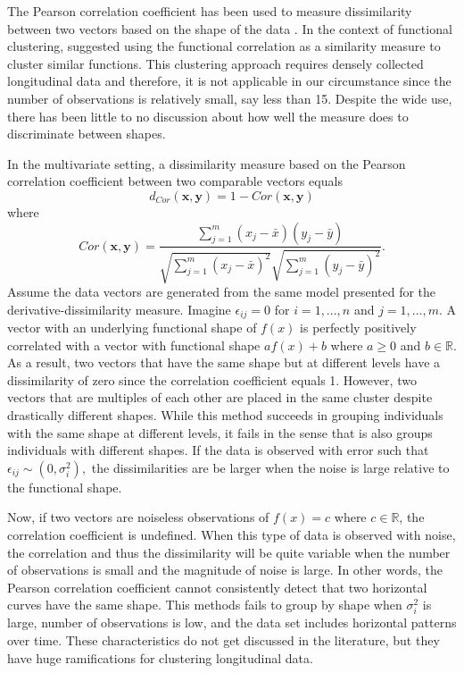 \documentclass[12pt]{article}
\newcommand{\B}[0]{\mathbf}
\begin{document}
The Pearson correlation coefficient has been used to measure dissimilarity between two vectors based on the shape of the data  \cite{chouakria2007,  eisen1998, chiou2008}. In the context of functional clustering, \textcite{chiou2008} suggested using the functional correlation as a similarity measure to cluster similar functions. This clustering approach requires densely collected longitudinal data and therefore, it is not applicable in our circumstance since the number of observations is relatively small, say less than 15. Despite the wide use, there has been little to no discussion about how well the measure does to discriminate between shapes.

In the multivariate setting, a dissimilarity measure based on the Pearson correlation coefficient between two comparable vectors equals 
$$d_{Cor}(\B x,\B y) = 1-Cor(\B x,\B y)$$ 
where $$Cor(\B x,\B y) = \frac{\sum^{m}_{j=1}(x_{j}-\bar{x})(y_{j}-\bar{y})}{\sqrt{\sum^{m}_{j=1}(x_{j}-\bar{x})^{2}}\sqrt{\sum^{m}_{j=1}(y_{j}-\bar{y})^{2}}}.$$
Assume the data vectors are generated from the same model presented for the derivative-dissimilarity measure. Imagine $\epsilon_{ij}=0$ for $i=1,...,n$ and $j=1,...,m$. A vector with an underlying functional shape of $f(x)$ is perfectly positively correlated with a vector with functional shape $af(x) + b$ where $a\geq0$ and $b\in\mathbb{R}$. As a result, two vectors that have the same shape but at different levels have a dissimilarity of zero since the correlation coefficient equals 1. However, two vectors that are multiples of each other are placed in the same cluster despite drastically different shapes. While this method succeeds in grouping individuals with the same shape at different levels, it fails in the sense that is also groups individuals with different shapes. If the data is observed with error such that $\epsilon_{ij}\sim(0,\sigma_{i}^{2}),$ the dissimilarities are be larger when the noise is large relative to the functional shape. 

Now, if two vectors are noiseless observations of $f(x)=c$ where $c\in\mathbb{R}$,  the correlation coefficient is undefined. When this type of data is observed with noise, the correlation and thus the dissimilarity will be quite variable when the number of observations is small and the magnitude of noise is large. In other words, the Pearson correlation coefficient cannot consistently detect that two horizontal curves have the same shape. This methods fails to group by shape when $\sigma_{i}^{2}$ is large, number of observations is low, and the data set includes horizontal patterns over time. These characteristics do not get discussed in the literature, but they have huge ramifications for clustering longitudinal data.
\end{document}
